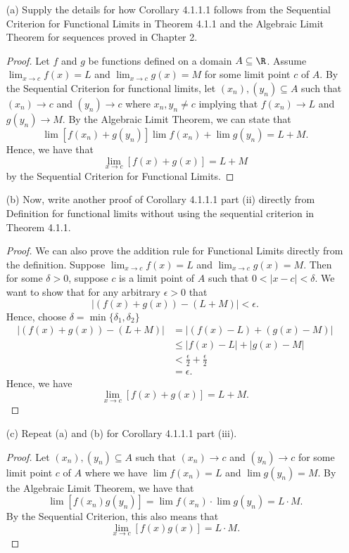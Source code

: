 \begin{enumerate}
    \item[(a)] Supply the details for how Corollary 4.1.1.1 follows from the Sequential Criterion for Functional Limits in Theorem 4.1.1 and the Algebraic Limit Theorem for sequences proved in Chapter 2.

    \begin{proof}
    Let \( f \) and \( g \) be functions defined on a domain \( A \subseteq \R  \). Assume \( \lim_{ x \to c } f(x) = L  \) and \( \lim_{ x \to c } g(x) = M  \) for some limit point \( c  \) of \( A  \). By the Sequential Criterion for functional limits, let \( (x_n), (y_n) \subseteq A  \) such that \( (x_n) \to c  \) and \( (y_n) \to c  \) where \( x_n, y_n \neq c  \) implying that \(f(x_n) \to L   \) and \( g(y_n) \to M  \). By the Algebraic Limit Theorem, we can state that 
    \[  \lim [f(x_n) + g(y_n)]\lim f(x_n) + \lim g(y_n) = L  + M.\]
    Hence, we have that 
    \[  \lim_{ x \to c } [f(x) + g(x)] = L + M  \]
    by the Sequential Criterion for Functional Limits.
    \end{proof}
    \item[(b)] Now, write another proof of Corollary 4.1.1.1 part (ii) directly from Definition for functional limits without using the sequential criterion in Theorem 4.1.1.
    \begin{proof}
    We can also prove the addition rule for Functional Limits directly from the definition. Suppose \( \lim_{ x \to c } f(x) = L  \) and \( \lim_{ x \to c } g(x) = M  \). Then for some \( \delta > 0  \), suppose \( c  \) is a limit point of \( A  \) such that \( 0 < | x -c  | < \delta \). We want to show that for any arbitrary \( \epsilon > 0  \) that 
    \[  | (f(x) + g(x)) - (L + M) | < \epsilon.  \]
    Hence, choose \( \delta = \min \{ \delta_1, \delta_2  \}  \)
    \begin{align*}
        |(f(x) + g(x)) - (L + M)   | &= | (f(x) - L ) + (g(x) - M ) |  \\
       &\leq  | f(x) - L  |  + | g(x) - M  | \\ 
       &< \frac{ \epsilon  }{ 2  }  + \frac{ \epsilon  }{ 2 } \\
       &= \epsilon.
    \end{align*}
    Hence, we have 
    \[  \lim_{ x \to c } [f(x) + g(x)] = L + M.  \]
    \end{proof}
    \item[(c)] Repeat (a) and (b) for Corollary 4.1.1.1 part (iii).
    \begin{proof}
    Let \( (x_n), (y_n) \subseteq A  \) such that \( (x_n) \to c  \) and \( (y_n) \to c  \) for some limit point \( c  \) of \( A  \) where  we have 
    \( \lim f(x_n) = L   \) and \( \lim  g(y_n) = M  \). By the Algebraic Limit Theorem, we have that 
    \[ \lim [f(x_n)g(y_n)] = \lim f(x_n) \cdot \lim g(y_n) = L \cdot M. \]
   By the Sequential Criterion, this also means that 
   \[  \lim_{ x \to c } [f(x)g(x)] = L \cdot M. \]


\end{proof}
\end{enumerate}
